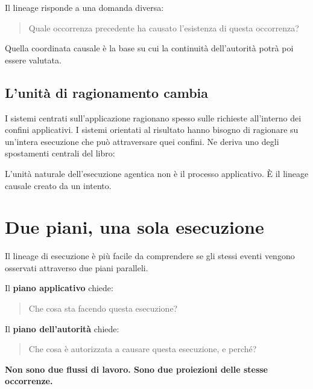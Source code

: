 \documentclass[10pt,oneside,openany]{book}
\newcommand{\term}[1]{\textbf{#1}}
\newcommand{\keyidea}[1]{%
  \vspace{3pt}
  \noindent\fbox{\begin{minipage}{0.94\linewidth}\small\raggedright\textbf{Idea chiave.} #1\end{minipage}}
  \vspace{3pt}
}
\renewcommand{\keyidea}[1]{\begin{keyideabox}#1\end{keyideabox}}
\begin{document}
Il lineage risponde a una domanda diversa:

\begin{quote}
Quale occorrenza precedente ha causato l'esistenza di questa occorrenza?
\end{quote}

Quella coordinata causale è la base su cui la continuità dell'autorità potrà poi essere valutata.

\section{L'unità di ragionamento cambia}
I sistemi centrati sull'applicazione ragionano spesso sulle richieste all'interno dei confini applicativi. I sistemi orientati al risultato hanno bisogno di ragionare su un'intera esecuzione che può attraversare quei confini. Ne deriva uno degli spostamenti centrali del libro:

\keyidea{L'unità naturale dell'esecuzione agentica non è il processo applicativo. È il lineage causale creato da un intento.}

\chapter{Due piani, una sola esecuzione}

Il lineage di esecuzione è più facile da comprendere se gli stessi eventi vengono osservati attraverso due piani paralleli.

Il \term{piano applicativo} chiede:

\begin{quote}
Che cosa sta facendo questa esecuzione?
\end{quote}

Il \term{piano dell'autorità} chiede:

\begin{quote}
Che cosa è autorizzata a causare questa esecuzione, e perché?
\end{quote}

\textbf{Non sono due flussi di lavoro. Sono due proiezioni delle stesse occorrenze.}
\end{document}
